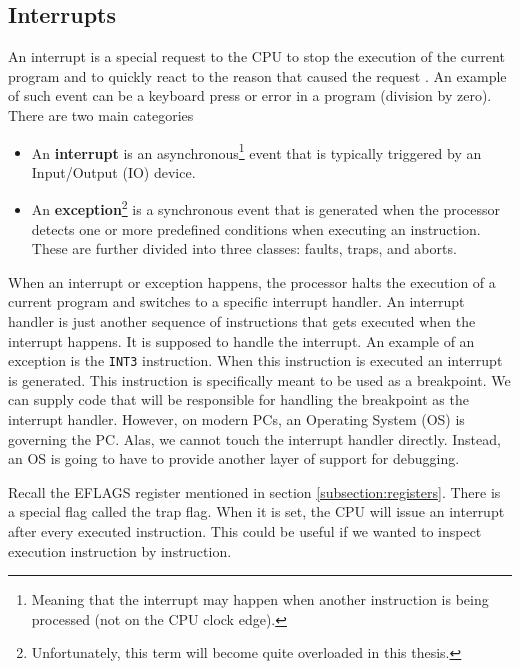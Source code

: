 \subsection{Interrupts}
An interrupt is a special request to the CPU to stop the execution of the
current program and to quickly react to the reason that caused the request
\cite{aps-interrupts}. An example of such event can be a keyboard press or
error in a program (division by zero). There are two main categories
\cite{intel-manual}
\begin{itemize}
    \item An \textbf{interrupt} is an asynchronous\footnote{Meaning that the
        interrupt may happen when another instruction is being processed (not
        on the CPU clock edge).} event that is typically triggered by an
        Input/Output (IO) device.
    \item An \textbf{exception}\footnote{Unfortunately, this term will become
        quite overloaded in this thesis.} is a synchronous event that is
        generated when the processor detects one or more predefined conditions
        when executing an instruction. These are further divided into three
        classes: faults, traps, and aborts.
\end{itemize}

When an interrupt or exception happens, the processor halts the execution of a
current program and switches to a specific interrupt handler. An interrupt
handler is just another sequence of instructions that gets executed when the
interrupt happens. It is supposed to handle the interrupt. An example of an
exception is the \texttt{INT3} instruction. When this instruction is executed
an interrupt is generated. This instruction is specifically meant to be used as
a breakpoint. We can supply code that will be responsible for handling the
breakpoint as the interrupt handler. However, on modern PCs, an Operating
System (OS) is governing the PC. Alas, we cannot touch the interrupt handler
directly. Instead, an OS is going to have to provide another layer of support
for debugging.

Recall the EFLAGS register mentioned in section \ref{subsection:registers}.
There is a special flag called the trap flag. When it is set, the CPU will
issue an interrupt after every executed instruction. This could be useful if we
wanted to inspect execution instruction by instruction.


